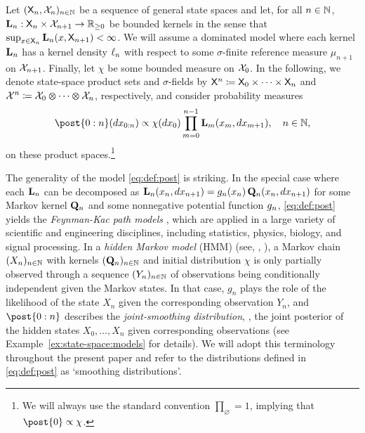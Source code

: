 Let $(\mathsf{X}_n, \mathcal{X}_n)_{n \in \mathbb{N}}$ be a sequence of general state spaces and let, for all $n \in \mathbb{N}$, $\mathbf{L}_{n} : \mathsf{X}_n \times \mathcal{X}_{n + 1} \to \mathbb{R}_{\geq 0}$ be bounded kernels in the sense that $\sup_{x \in \mathsf{X}_n} \mathbf{L}_{n}(x, \mathsf{X}_{n + 1}) < \infty$. We will assume a dominated model where each kernel $\mathbf{L}_{n}$ has a kernel density $\ell_{n}$ with respect to some $\sigma$-finite reference measure $\mu_{n + 1}$ on $\mathcal{X}_{n + 1}$. Finally, let $\chi$ be some bounded measure on $\mathcal{X}_0$. In the following, we denote state-space product sets and $\sigma$-fields by $\mathsf{X}^n \coloneqq \mathsf{X}_0 \times \cdots \times \mathsf{X}_n$ and $\mathcal{X}^n \coloneqq \mathcal{X}_0 \varotimes \cdots \varotimes \mathcal{X}_n$, respectively, and consider probability measures  
\begin{equation} \label{eq:def:post}
\post{0:n}(\rmd x_{0:n}) \propto \chi(\rmd x_0) \prod_{m = 0}^{n - 1} \uk{m}(x_m, \rmd x_{m + 1}), \quad n \in \nset, 
\end{equation}
on these product spaces.\footnote{We will always use the standard convention $\prod_{\varnothing} = 1$, implying that $\post{0} \propto \chi$.} 

The generality of the model \eqref{eq:def:post} is striking. In the special case where each $\mathbf{L}_{n}$ can be decomposed as $\mathbf{L}_{n}(x_n, d x_{n + 1}) = g_{n}(x_n) \, \mathbf{Q}_n(x_n, d x_{n + 1})$ for some Markov kernel $\mathbf{Q}_n$ and some nonnegative potential function $g_{n}$, \eqref{eq:def:post} yields the \emph{Feynman-Kac path models} \cite{delmoral:2004}, which are applied in a large variety of scientific and engineering disciplines, including statistics, physics, biology, and signal processing. In a \emph{hidden Markov model} (HMM) (see, \eg,  \cite{Cappe:2005:IHM:1088883}), a Markov chain $(X_n)_{n \in \mathbb{N}}$ with kernels $(\mathbf{Q}_n)_{n \in \mathbb{N}}$ and initial distribution $\chi$ is only partially observed through a sequence $(Y_n)_{n \in \mathbb{N}}$ of observations being conditionally independent given the Markov states. In that case, $g_n$ plays the role of the likelihood of the state $X_n$ given the corresponding observation $Y_n$, and $\post{0:n}$ describes the \emph{joint-smoothing distribution}, \ie, the joint posterior of the hidden states $X_0, \ldots, X_n$ given corresponding observations (see Example~\ref{ex:state-space:models} for details). We will adopt this terminology throughout the present paper and refer to the distributions defined in \eqref{eq:def:post} as `smoothing distributions'.

